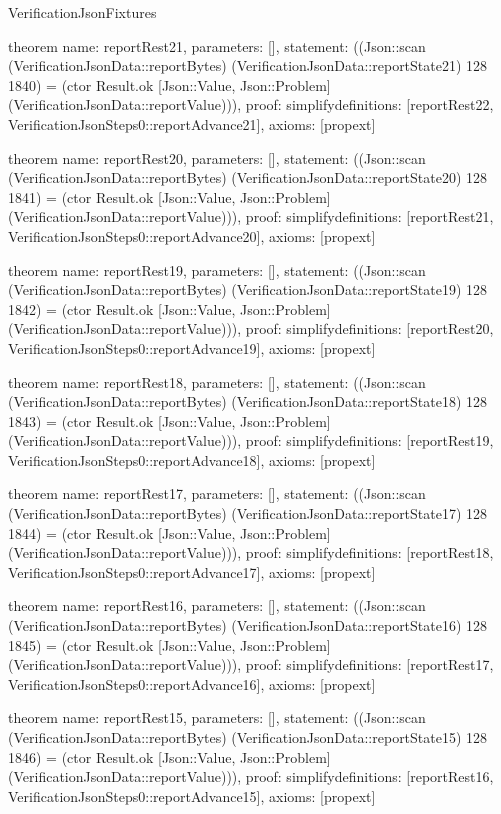 \begin{lexlean}{VerificationJsonFixtures}
\begin{semanticmodule}
theorem{
  name: reportRest21,
  parameters: [],
  statement: ((Json::scan (VerificationJsonData::reportBytes) (VerificationJsonData::reportState21) 128 1840) = (ctor Result.ok [Json::Value, Json::Problem] (VerificationJsonData::reportValue))),
  proof: simplify{definitions: [reportRest22, VerificationJsonSteps0::reportAdvance21]},
  axioms: [propext]
}

theorem{
  name: reportRest20,
  parameters: [],
  statement: ((Json::scan (VerificationJsonData::reportBytes) (VerificationJsonData::reportState20) 128 1841) = (ctor Result.ok [Json::Value, Json::Problem] (VerificationJsonData::reportValue))),
  proof: simplify{definitions: [reportRest21, VerificationJsonSteps0::reportAdvance20]},
  axioms: [propext]
}

theorem{
  name: reportRest19,
  parameters: [],
  statement: ((Json::scan (VerificationJsonData::reportBytes) (VerificationJsonData::reportState19) 128 1842) = (ctor Result.ok [Json::Value, Json::Problem] (VerificationJsonData::reportValue))),
  proof: simplify{definitions: [reportRest20, VerificationJsonSteps0::reportAdvance19]},
  axioms: [propext]
}

theorem{
  name: reportRest18,
  parameters: [],
  statement: ((Json::scan (VerificationJsonData::reportBytes) (VerificationJsonData::reportState18) 128 1843) = (ctor Result.ok [Json::Value, Json::Problem] (VerificationJsonData::reportValue))),
  proof: simplify{definitions: [reportRest19, VerificationJsonSteps0::reportAdvance18]},
  axioms: [propext]
}

theorem{
  name: reportRest17,
  parameters: [],
  statement: ((Json::scan (VerificationJsonData::reportBytes) (VerificationJsonData::reportState17) 128 1844) = (ctor Result.ok [Json::Value, Json::Problem] (VerificationJsonData::reportValue))),
  proof: simplify{definitions: [reportRest18, VerificationJsonSteps0::reportAdvance17]},
  axioms: [propext]
}

theorem{
  name: reportRest16,
  parameters: [],
  statement: ((Json::scan (VerificationJsonData::reportBytes) (VerificationJsonData::reportState16) 128 1845) = (ctor Result.ok [Json::Value, Json::Problem] (VerificationJsonData::reportValue))),
  proof: simplify{definitions: [reportRest17, VerificationJsonSteps0::reportAdvance16]},
  axioms: [propext]
}

theorem{
  name: reportRest15,
  parameters: [],
  statement: ((Json::scan (VerificationJsonData::reportBytes) (VerificationJsonData::reportState15) 128 1846) = (ctor Result.ok [Json::Value, Json::Problem] (VerificationJsonData::reportValue))),
  proof: simplify{definitions: [reportRest16, VerificationJsonSteps0::reportAdvance15]},
  axioms: [propext]
}


\end{semanticmodule}
\end{lexlean}

